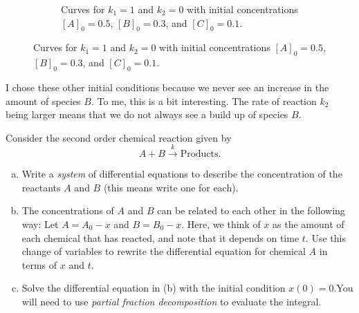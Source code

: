 \documentclass[12pt]{article} %
\begin{document}
\begin{solution}
\begin{enumerate}[(a)]
\begin{figure}[H]
\begin{subfigure}[b]{0.3\textwidth}
            \caption{Curves for $k_1=1$ and $k_2=0$ with initial concentrations $[A]_0=0.5$, $[B]_0=0.3$, and $[C]_0=0.1$. }
        \end{subfigure}
    \end{figure}

    I chose these other initial conditions because we never see an increase in the amount of species $B$.  To me, this is a bit interesting.  The rate of reaction $k_2$ being larger means that we do not always see a build up of species $B$.  
\end{enumerate}
\end{solution}

\newpage

\begin{problem}
Consider the second order chemical reaction given by
\[
A+B \xrightarrow{k} \textrm{Products}.
\]
\begin{enumerate}[(a)]
    \item Write a \emph{system} of differential equations to describe the concentration of the reactants $A$ and $B$ (this means write one for each).
    \item The concentrations of $A$ and $B$ can be related to each other in the following way: Let $A=A_0-x$ and $B=B_0-x$. Here, we think of $x$ as the amount of each chemical that has reacted, and note that it depends on time $t$. Use this change of variables to rewrite the differential equation for chemical $A$ in terms of $x$ and $t$.
    \item Solve the differential equation in (b) with the initial condition $x(0)=0$.You will need to use \emph{partial fraction decomposition} to evaluate the integral.
\end{enumerate}
\end{problem}
\end{document}
